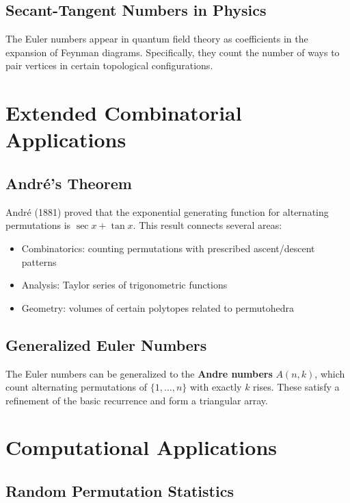 \subsection{Secant-Tangent Numbers in Physics}

The Euler numbers appear in quantum field theory as coefficients in the expansion
of Feynman diagrams. Specifically, they count the number of ways to pair vertices
in certain topological configurations.

\section{Extended Combinatorial Applications}

\subsection{Andr\'{e}'s Theorem}

Andr\'{e} (1881) proved that the exponential generating function for alternating permutations
is $\sec x + \tan x$. This result connects several areas:
\begin{itemize}
\item Combinatorics: counting permutations with prescribed ascent/descent patterns
\item Analysis: Taylor series of trigonometric functions
\item Geometry: volumes of certain polytopes related to permutohedra
\end{itemize}

\subsection{Generalized Euler Numbers}

The Euler numbers can be generalized to the \textbf{Andre numbers} $A(n,k)$, which count
alternating permutations of $\{1, \ldots, n\}$ with exactly $k$ rises. These satisfy
a refinement of the basic recurrence and form a triangular array.

\section{Computational Applications}

\subsection{Random Permutation Statistics}

